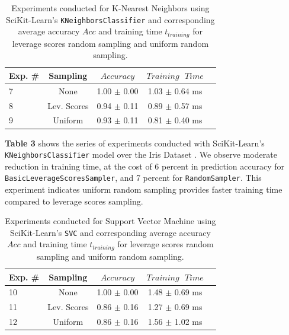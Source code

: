 \documentclass{article}
\theoremstyle{plain}
\theoremstyle{definition}
\theoremstyle{remark}
\begin{document}
\begin{table}[t]
	\caption{Experiments conducted for K-Nearest Neighbors using SciKit-Learn's \texttt{KNeighborsClassifier} and corresponding average accuracy $Acc$ and training time $t_{training}$ for leverage scores random sampling and uniform random sampling.}
	\label{t3}
	\vskip 0.15in
	\begin{center}
		\begin{small}
			\begin{sc}
				\begin{tabular}{lcccr}
					\toprule
					Exp. \# & Sampling & $Accuracy$ & $Training \text{ } Time$\\
					\midrule
					7 & None & 1.00 $\pm$ 0.00 & 1.03 $\pm$ 0.64 ms \\
					8 & Lev. Scores & 0.94 $\pm$ 0.11 & 0.89 $\pm$ 0.57 ms \\
					9 & Uniform & 0.93 $\pm$ 0.11 & 0.81 $\pm$ 0.40 ms \\
					\bottomrule
				\end{tabular}
			\end{sc}
		\end{small}
	\end{center}
	\vskip -0.1in
\end{table}

\textbf{Table 3} shows the series of experiments conducted with SciKit-Learn's \texttt{KNeighborsClassifier} model over the Iris Dataset \cite{iris}. We observe moderate reduction in training time, at the cost of 6 percent in prediction accuracy for \texttt{BasicLeverageScoresSampler}, and 7 percent for \texttt{RandomSampler}. This experiment indicates uniform random sampling provides faster training time compared to leverage scores sampling.

\begin{table}[t]
	\caption{Experiments conducted for Support Vector Machine using SciKit-Learn's \texttt{SVC} and corresponding average accuracy $Acc$ and training time $t_{training}$ for leverage scores random sampling and uniform random sampling.}
	\label{t4}
	\vskip 0.15in
	\begin{center}
		\begin{small}
			\begin{sc}
				\begin{tabular}{lcccr}
					\toprule
					Exp. \# & Sampling & $Accuracy$ & $Training \text{ } Time$\\
					\midrule
					10 & None & 1.00 $\pm$ 0.00 & 1.48 $\pm$ 0.69 ms \\
					11 & Lev. Scores & 0.86 $\pm$ 0.16 & 1.27 $\pm$ 0.69 ms \\
					12 & Uniform & 0.86 $\pm$ 0.16 & 1.56 $\pm$ 1.02 ms \\
					\bottomrule
				\end{tabular}
			\end{sc}
		\end{small}
	\end{center}
	\vskip -0.1in
\end{table}
\end{document}
